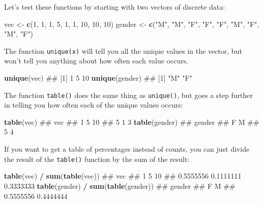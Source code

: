 \documentclass[]{book}
\newenvironment{Shaded}{\begin{snugshade}}{\end{snugshade}}
\newcommand{\KeywordTok}[1]{\textcolor[rgb]{0.13,0.29,0.53}{\textbf{#1}}}
\newcommand{\DecValTok}[1]{\textcolor[rgb]{0.00,0.00,0.81}{#1}}
\newcommand{\StringTok}[1]{\textcolor[rgb]{0.31,0.60,0.02}{#1}}
\newcommand{\OperatorTok}[1]{\textcolor[rgb]{0.81,0.36,0.00}{\textbf{#1}}}
\newcommand{\NormalTok}[1]{#1}
\theoremstyle{definition}
\theoremstyle{definition}
\theoremstyle{remark}
\begin{document}
Let's test these functions by starting with two vectors of discrete
data:

\begin{Shaded}
\begin{Highlighting}[]
\NormalTok{vec <-}\StringTok{ }\KeywordTok{c}\NormalTok{(}\DecValTok{1}\NormalTok{, }\DecValTok{1}\NormalTok{, }\DecValTok{1}\NormalTok{, }\DecValTok{5}\NormalTok{, }\DecValTok{1}\NormalTok{, }\DecValTok{1}\NormalTok{, }\DecValTok{10}\NormalTok{, }\DecValTok{10}\NormalTok{, }\DecValTok{10}\NormalTok{)}
\NormalTok{gender <-}\StringTok{ }\KeywordTok{c}\NormalTok{(}\StringTok{"M"}\NormalTok{, }\StringTok{"M"}\NormalTok{, }\StringTok{"F"}\NormalTok{, }\StringTok{"F"}\NormalTok{, }\StringTok{"F"}\NormalTok{, }\StringTok{"M"}\NormalTok{, }\StringTok{"F"}\NormalTok{, }\StringTok{"M"}\NormalTok{, }\StringTok{"F"}\NormalTok{)}
\end{Highlighting}
\end{Shaded}

The function \texttt{unique(x)} will tell you all the unique values in
the vector, but won't tell you anything about how often each value
occurs.

\begin{Shaded}
\begin{Highlighting}[]
\KeywordTok{unique}\NormalTok{(vec)}
\NormalTok{## [1]  1  5 10}
\KeywordTok{unique}\NormalTok{(gender)}
\NormalTok{## [1] "M" "F"}
\end{Highlighting}
\end{Shaded}

The function \texttt{table()} does the same thing as \texttt{unique()},
but goes a step further in telling you how often each of the unique
values occurs:

\begin{Shaded}
\begin{Highlighting}[]
\KeywordTok{table}\NormalTok{(vec)}
\NormalTok{## vec}
\NormalTok{##  1  5 10 }
\NormalTok{##  5  1  3}
\KeywordTok{table}\NormalTok{(gender)}
\NormalTok{## gender}
\NormalTok{## F M }
\NormalTok{## 5 4}
\end{Highlighting}
\end{Shaded}

If you want to get a table of percentages instead of counts, you can
just divide the result of the \texttt{table()} function by the sum of
the result:

\begin{Shaded}
\begin{Highlighting}[]
\KeywordTok{table}\NormalTok{(vec) }\OperatorTok{/}\StringTok{ }\KeywordTok{sum}\NormalTok{(}\KeywordTok{table}\NormalTok{(vec))}
\NormalTok{## vec}
\NormalTok{##         1         5        10 }
\NormalTok{## 0.5555556 0.1111111 0.3333333}
\KeywordTok{table}\NormalTok{(gender) }\OperatorTok{/}\StringTok{ }\KeywordTok{sum}\NormalTok{(}\KeywordTok{table}\NormalTok{(gender))}
\NormalTok{## gender}
\NormalTok{##         F         M }
\NormalTok{## 0.5555556 0.4444444}
\end{Highlighting}
\end{Shaded}
\end{document}
